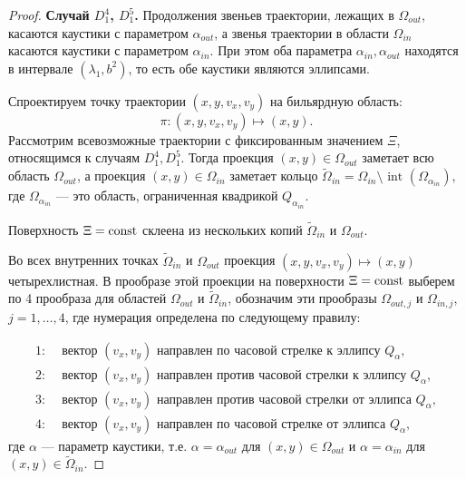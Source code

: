 \begin{proof}


\textbf{Случай $D_1^4$, $D_1^5$.}
Продолжения звеньев траектории, лежащих в $\Omega_{out}$, касаются каустики с параметром $\alpha_{out}$, а звенья траектории в области $\Omega_{in}$ касаются каустики с параметром $\alpha_{in}$. При этом оба параметра $\alpha_{in}, \alpha_{out}$ находятся в интервале $(\lambda_1, b^2)$, то есть обе каустики являются эллипсами.

Спроектируем точку траектории $(x,y,v_x, v_y)$ на бильярдную область:
$$\pi : (x,y,v_x, v_y) \mapsto (x, y).$$
Рассмотрим всевозможные траектории с фиксированным значением $\Xi$, относящимся к случаям $D_1^4, D_1^5$. Тогда проекция $(x,y) \in \Omega_{out}$ заметает всю область $\Omega_{out}$, а проекция  $(x,y) \in \Omega_{in}$ заметает кольцо $\widetilde{\Omega}_{in} = \Omega_{in} \setminus \text{ int }(\Omega_{\alpha_{in}})$, где $\Omega_{\alpha_{in}}$ --- это область, ограниченная квадрикой $Q_{\alpha_{in}}$. 

Поверхность $\Xi = \mathrm{const}$ склеена из нескольких копий $\widetilde{\Omega}_{in}$ и $\Omega_{out}$. 

Во всех внутренних точках $\widetilde{\Omega}_{in}$ и $\Omega_{out}$ проекция $(x, y, v_x, v_y) \mapsto (x,y)$ четырехлистная.
В прообразе этой проекции на поверхности $\Xi = \mathrm{const}$ выберем по 4 прообраза для областей $\Omega_{out}$ и $\widetilde{\Omega}_{in}$, обозначим эти прообразы 
$\Omega_{out, j}$ и $\Omega_{in, j}$, $j=1,\ldots,4$, 
где нумерация определена по следующему правилу:

\begin{equation}
\begin{array}{ll}
1: & \text{ вектор } (v_x, v_y) \text{ направлен по часовой стрелке к эллипсу } Q_{\alpha}, \\
2: & \text{ вектор } (v_x, v_y) \text{ направлен против часовой стрелки к эллипсу }  Q_{\alpha}, \\
3: & \text{ вектор } (v_x, v_y) \text{ направлен против часовой стрелки от эллипса }  Q_{\alpha}, \\
4: & \text{ вектор } (v_x, v_y) \text{ направлен по часовой стрелке от эллипса }  Q_{\alpha},
\end{array}
\label{eq:ell_numeration}
\end{equation}
где $\alpha$ --- параметр каустики, т.е. $\alpha=\alpha_{out}$ для $(x,y) \in \Omega_{out}$ и $\alpha=\alpha_{in}$ для $(x,y) \in \widetilde{\Omega}_{in}$.


\end{proof}
